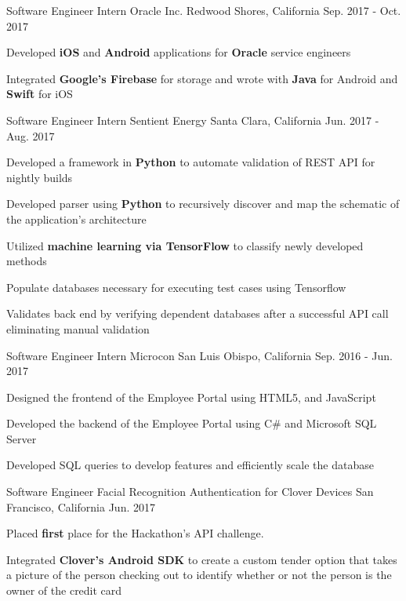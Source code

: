 \begin{cventries}
\cventry
{Software Engineer Intern}
{Oracle Inc.}
{Redwood Shores, California}
{Sep. 2017 - Oct. 2017}
{
\begin{cvitems}
\item {Developed \textbf{iOS} and \textbf{Android} applications for \textbf{Oracle} service engineers}
\item {Integrated \textbf{Google's Firebase} for storage and wrote with \textbf{Java} for Android and \textbf{Swift} for iOS}
\end{cvitems}
}

\cventry
{Software Engineer Intern} %
{Sentient Energy} %
{Santa Clara, California} %
{Jun. 2017 - Aug. 2017} %
{ %
\begin{cvitems}
\item {Developed a framework in \textbf{Python} to automate validation of REST API for nightly builds}
\item {Developed parser using \textbf{Python} to recursively discover and map the schematic of the application's architecture}
\item {Utilized \textbf{machine learning via TensorFlow} to classify newly developed methods}
\item {Populate databases necessary for executing test cases using Tensorflow} 
\item {Validates back end by verifying dependent databases after a successful API call eliminating manual validation}
\end{cvitems}
}


\cventry
{Software Engineer Intern} %
{Microcon} %
{San Luis Obispo, California} %
{Sep. 2016 - Jun. 2017} %
{ %
\begin{cvitems}
\item {Designed the frontend of the Employee Portal using HTML5, and JavaScript}
\item {Developed the backend of the Employee Portal using C\# and Microsoft SQL Server}
\item {Developed SQL queries to develop features and efficiently scale the database}
\end{cvitems}
}



\cventry
{Software Engineer} %
{Facial Recognition Authentication for Clover Devices} %
{San Francisco, California} %
{Jun. 2017} %
{ %
\begin{cvitems}
\item {Placed \textbf{first} place for the Hackathon's API challenge.}
\item {Integrated \textbf{Clover's Android SDK} to create a custom tender option that takes a picture of the person checking out to identify whether or not the person is the owner of the credit card}
\end{cvitems}
}

\end{cventries}
